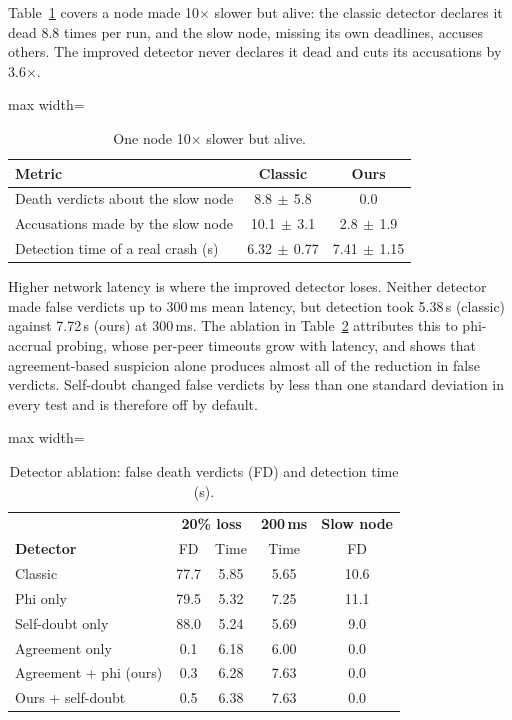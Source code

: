 \documentclass[sigconf,nonacm]{acmart}
\newcommand{\win}[1]{\textcolor{win}{#1}}
\newcommand{\loss}[1]{\textcolor{loss}{#1}}
\newcommand{\pmsd}[2]{#1{\scriptsize$\,\pm\,$#2}}
\begin{document}
Table~\ref{tab:slowdet} covers a node made 10$\times$ slower but alive: the classic detector declares it dead 8.8 times per run, and the slow node, missing its own deadlines, accuses others. The improved detector never declares it dead and cuts its accusations by 3.6$\times$.

\begin{table}[h]
\caption{One node 10$\times$ slower but alive.}
\label{tab:slowdet}
\small
\begin{adjustbox}{max width=\columnwidth}
\begin{tabular}{lcc}
\toprule
\textbf{Metric} & \textbf{Classic} & \textbf{Ours} \\
\midrule
Death verdicts about the slow node & \pmsd{8.8}{5.8} & \win{0.0} \\
Accusations made by the slow node & \pmsd{10.1}{3.1} & \win{\pmsd{2.8}{1.9}} \\
Detection time of a real crash (s) & \pmsd{6.32}{0.77} & \loss{\pmsd{7.41}{1.15}} \\
\bottomrule
\end{tabular}
\end{adjustbox}
\end{table}

Higher network latency is where the improved detector loses. Neither detector made false verdicts up to 300\,ms mean latency, but detection took 5.38\,s (classic) against 7.72\,s (ours) at 300\,ms. The ablation in Table~\ref{tab:ablation-det} attributes this to phi-accrual probing, whose per-peer timeouts grow with latency, and shows that agreement-based suspicion alone produces almost all of the reduction in false verdicts. Self-doubt changed false verdicts by less than one standard deviation in every test and is therefore off by default.

\begin{table}[h]
\caption{Detector ablation: false death verdicts (FD) and detection time (s).}
\label{tab:ablation-det}
\small
\begin{adjustbox}{max width=\columnwidth}
\begin{tabular}{lcccc}
\toprule
 & \multicolumn{2}{c}{\textbf{20\% loss}} & \textbf{200\,ms} & \textbf{Slow node} \\
\textbf{Detector} & FD & Time & Time & FD \\
\midrule
Classic & 77.7 & 5.85 & 5.65 & 10.6 \\
Phi only & 79.5 & 5.32 & 7.25 & 11.1 \\
Self-doubt only & 88.0 & 5.24 & 5.69 & 9.0 \\
Agreement only & 0.1 & 6.18 & 6.00 & 0.0 \\
Agreement + phi (ours) & 0.3 & 6.28 & 7.63 & 0.0 \\
Ours + self-doubt & 0.5 & 6.38 & 7.63 & 0.0 \\
\bottomrule
\end{tabular}
\end{adjustbox}
\end{table}
\end{document}
